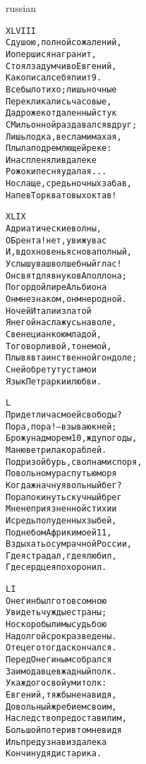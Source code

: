 \documentclass[12pt,twocolumn]{article}
\begin{document}
\begin{center}
\begin{otherlanguage*}{russian}
\begin{minipage}[t]{\dimexpr 0.5\textwidth -\tabcolsep-.5pt}
\begin{alltt}\normalfont\centering
XLVIII
С душою, полной сожалений,
И опершися на гранит,
Стоял задумчиво Евгений,
Как описал себя пиит 9.
Все было тихо; лишь ночные
Перекликались часовые,
Да дрожек отдаленный стук
С Мильонной раздавался вдруг;
Лишь лодка, веслами махая,
Плыла по дремлющей реке:
И нас пленяли вдалеке
Рожок и песня удалая...
Но слаще, средь ночных забав,
Напев Торкватовых октав!
\end{alltt}
\end{minipage}
\clearpage

\begin{minipage}[t]{\dimexpr 0.5\textwidth -\tabcolsep-.5pt}
\begin{alltt}\normalfont\centering
XLIX
Адриатические волны,
О Брента! нет, увижу вас
И, вдохновенья снова полный,
Услышу ваш волшебный глас!
Он свят для внуков Аполлона;
По гордой лире Альбиона
Он мне знаком, он мне родной.
Ночей Италии златой
Я негой наслажусь на воле,
С венецианкою младой,
То говорливой, то немой,
Плывя в таинственной гондоле;
С ней обретут уста мои
Язык Петрарки и любви.
\end{alltt}
\end{minipage}

\begin{minipage}[t]{\dimexpr 0.5\textwidth -\tabcolsep-.5pt}
\begin{alltt}\normalfont\centering
L
Придет ли час моей свободы?
Пора, пора! — взываю к ней;
Брожу над морем 10, жду погоды,
Маню ветрила кораблей.
Под ризой бурь, с волнами споря,
По вольному распутью моря
Когда ж начну я вольный бег?
Пора покинуть скучный брег
Мне неприязненной стихии
И средь полуденных зыбей,
Под небом Африки моей 11,
Вздыхать о сумрачной России,
Где я страдал, где я любил,
Где сердце я похоронил.
\end{alltt}
\end{minipage}
\clearpage

\begin{minipage}[t]{\dimexpr 0.5\textwidth -\tabcolsep-.5pt}
\begin{alltt}\normalfont\centering
LI
Онегин был готов со мною
Увидеть чуждые страны;
Но скоро были мы судьбою
На долгой срок разведены.
Отец его тогда скончался.
Перед Онегиным собрался
Заимодавцев жадный полк.
У каждого свой ум и толк:
Евгений, тяжбы ненавидя,
Довольный жребием своим,
Наследство предоставил им,
Большой потери в том не видя
Иль предузнав издалека
Кончину дяди старика.
\end{alltt}
\end{minipage}


\end{otherlanguage*}
\end{center}
\end{document}
